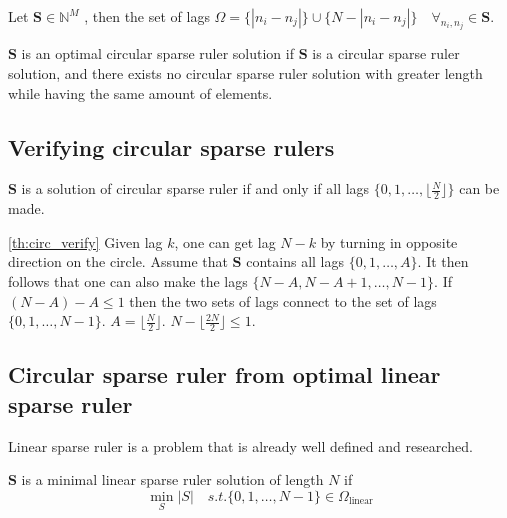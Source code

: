 \documentclass[a4paper, openany, oneside]{memoir}
\begin{document}
\begin{blockDefinition}
    Let $\mathbf{S} \in \mathbb{N}^M$ , then the set of lags $\Omega = \{|n_i-n_j|\} \cup \{N-|n_i-n_j|\} \quad \forall_{n_i,n_j}\in \mathbf{S}$.
\end{blockDefinition}
    

\begin{blockDefinition}
    $\mathbf{S}$ is an optimal circular sparse ruler solution if $\mathbf{S}$ is a circular sparse ruler solution, and there exists no circular sparse ruler solution with greater length while having the same amount of elements.
\end{blockDefinition}

\subsection{Verifying circular sparse rulers}

\begin{blockTheorem} \label{th:circ_verify}\nolinebreak
    $\mathbf{S}$ is a solution of circular sparse ruler if and only if all lags $\{0,1,\dots, \lfloor\frac{N}{2}\rfloor\}$ can be made. \nolinebreak
\end{blockTheorem}

\begin{blockProofTheorem}{\ref{th:circ_verify}}
    Given lag $k$, one can get lag $N-k$ by turning in opposite direction on the circle. Assume that $\mathbf{S}$ contains all lags $\{0,1,\dots, A\}$. It then follows that one can also make the lags  $\{N-A,N-A+1,\dots, N-1\}$. If $(N-A)-A \leq 1$ then the two sets of lags connect to the set of lags $\{0,1,\dots,N-1\}$. $A=\lfloor\frac{N}{2}\rfloor$. $N-\lfloor\frac{2N}{2}\rfloor \leq 1$.
\end{blockProofTheorem}

\subsection{Circular sparse ruler from optimal linear sparse ruler}\label{ssec:minimal_linear_s}
Linear sparse ruler is a problem that is already well defined and researched. 

\begin{blockDefinition}\label{def:minimal_sparse}
    $\mathbf{S}$ is a minimal linear sparse ruler solution of length $N$ if 
    $$
    \min_S|S| \quad s.t. \{0,1,\dots,N-1\} \in \Omega_{\text{linear}}
    $$
\end{blockDefinition}
\end{document}
